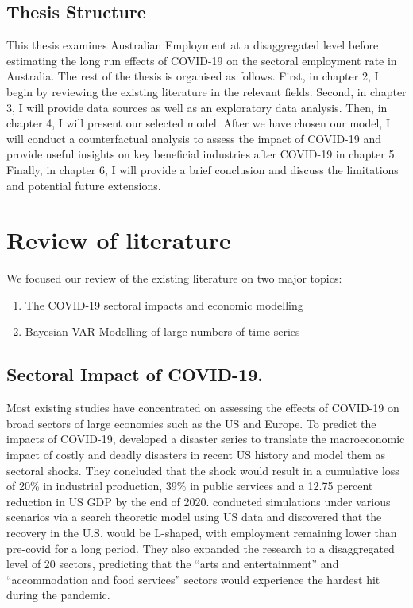 \documentclass{monashthesis}
\begin{document}
\hypertarget{thesis-structure}{%
\section{Thesis Structure}\label{thesis-structure}}

This thesis examines Australian Employment at a disaggregated level before estimating the long run effects of COVID-19 on the sectoral employment rate in Australia. The rest of the thesis is organised as follows. First, in chapter 2, I begin by reviewing the existing literature in the relevant fields. Second, in chapter 3, I will provide data sources as well as an exploratory data analysis. Then, in chapter 4, I will present our selected model. After we have chosen our model, I will conduct a counterfactual analysis to assess the impact of COVID-19 and provide useful insights on key beneficial industries after COVID-19 in chapter 5. Finally, in chapter 6, I will provide a brief conclusion and discuss the limitations and potential future extensions.

\clearpage

\hypertarget{review-of-literature}{%
\chapter{Review of literature}\label{review-of-literature}}

We focused our review of the existing literature on two major topics:

\begin{enumerate}
\def\labelenumi{\arabic{enumi}.}
\item
  The COVID-19 sectoral impacts and economic modelling
\item
  Bayesian VAR Modelling of large numbers of time series
\end{enumerate}

\hypertarget{sectoral-impact-of-covid-19.}{%
\section{Sectoral Impact of COVID-19.}\label{sectoral-impact-of-covid-19.}}

Most existing studies have concentrated on assessing the effects of COVID-19 on broad sectors of large economies such as the US and Europe. To predict the impacts of COVID-19, \textcite{ludvigson2020covid} developed a disaster series to translate the macroeconomic impact of costly and deadly disasters in recent US history and model them as sectoral shocks. They concluded that the shock would result in a cumulative loss of 20\% in industrial production, 39\% in public services and a 12.75 percent reduction in US GDP by the end of 2020. \textcite{gregory2020pandemic} conducted simulations under various scenarios via a search theoretic model using US data and discovered that the recovery in the U.S. would be L-shaped, with employment remaining lower than pre-covid for a long period. They also expanded the research to a disaggregated level of 20 sectors, predicting that the ``arts and entertainment'' and ``accommodation and food services'' sectors would experience the hardest hit during the pandemic.
\end{document}
